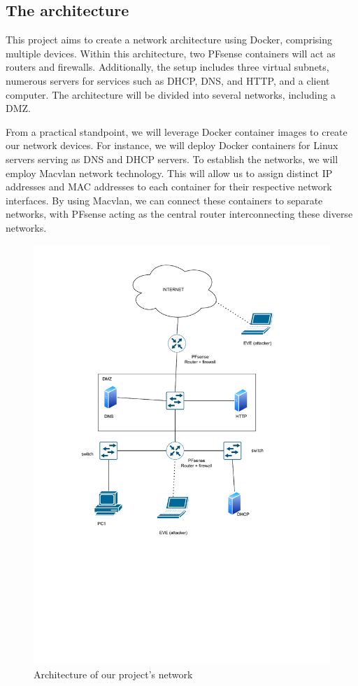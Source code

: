 \documentclass[a4paper,11pt,singlespacing]{article}
\begin{document}
\subsection{The architecture}
This project aims to create a network architecture using Docker, comprising multiple devices. Within this architecture, two PFsense containers will act as routers and firewalls. Additionally, the setup includes three virtual subnets, numerous servers for services such as DHCP, DNS, and HTTP, and a client computer. The architecture will be divided into several networks, including a DMZ.
\par
From a practical standpoint, we will leverage Docker container images to create our network devices. For instance, we will deploy Docker containers for Linux servers serving as DNS and DHCP servers. To establish the networks, we will employ Macvlan network technology. This will allow us to assign distinct IP addresses and MAC addresses to each container for their respective network interfaces. By using Macvlan, we can connect these containers to separate networks, with PFsense acting as the central router interconnecting these diverse networks.\par

\begin{figure}[bp!]
    \centering
    \includegraphics[scale=0.61]{images/architecture_sketch.pdf}
    \caption{Architecture of our project's network}
    \label{fig:1}
\end{figure}
\end{document}
